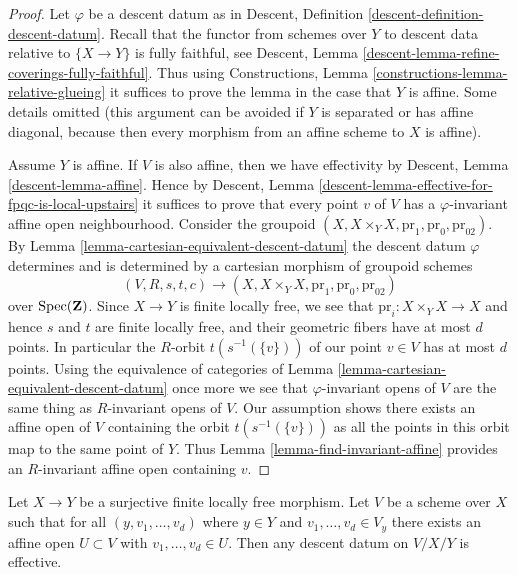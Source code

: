 \begin{proof}
Let $\varphi$ be a descent datum as in
Descent, Definition \ref{descent-definition-descent-datum}.
Recall that the functor from schemes over $Y$ to descent data
relative to $\{X \to Y\}$ is fully faithful, see
Descent, Lemma \ref{descent-lemma-refine-coverings-fully-faithful}.
Thus using Constructions, Lemma \ref{constructions-lemma-relative-glueing}
it suffices to prove the lemma in the case that $Y$ is affine.
Some details omitted (this argument can be avoided if $Y$ is
separated or has affine diagonal, because then every morphism from
an affine scheme to $X$ is affine).

\medskip\noindent
Assume $Y$ is affine. If $V$ is also affine, then we have effectivity by
Descent, Lemma \ref{descent-lemma-affine}. Hence by
Descent, Lemma \ref{descent-lemma-effective-for-fpqc-is-local-upstairs}
it suffices to prove that every point $v$ of $V$ has a $\varphi$-invariant
affine open neighbourhood. Consider the groupoid
$(X, X \times_Y X, \text{pr}_1, \text{pr}_0, \text{pr}_{02})$.
By Lemma \ref{lemma-cartesian-equivalent-descent-datum}
the descent datum $\varphi$ determines and is determined by
a cartesian morphism of groupoid schemes
$$
(V, R, s, t, c)
\longrightarrow
(X, X \times_Y X, \text{pr}_1, \text{pr}_0, \text{pr}_{02})
$$
over $\mathop{\mathrm{Spec}}(\mathbf{Z})$.
Since $X \to Y$ is finite locally free, we see that
$\text{pr}_i : X \times_Y X \to X$ and hence $s$ and $t$
are finite locally free, and their geometric fibers have at most $d$
points. In particular the $R$-orbit $t(s^{-1}(\{v\}))$ of our point
$v \in V$ has at most $d$ points. Using the equivalence of categories of
Lemma \ref{lemma-cartesian-equivalent-descent-datum}
once more we see that $\varphi$-invariant opens of $V$
are the same thing as $R$-invariant opens of $V$.
Our assumption shows there exists an affine open of $V$
containing the orbit $t(s^{-1}(\{v\}))$ as all the points
in this orbit map to the same point of $Y$.
Thus Lemma \ref{lemma-find-invariant-affine}
provides an $R$-invariant affine open containing $v$.
\end{proof}

\begin{lemma}
\label{lemma-descend-along-finite}
Let $X \to Y$ be a surjective finite locally free morphism. 
Let $V$ be a scheme over $X$ such that for all 
$(y, v_1, \ldots, v_d)$ where $y \in Y$ and
$v_1, \ldots, v_d \in V_y$ there exists an affine open
$U \subset V$ with $v_1, \ldots, v_d \in U$.
Then any descent datum on $V/X/Y$ is effective.
\end{lemma}

